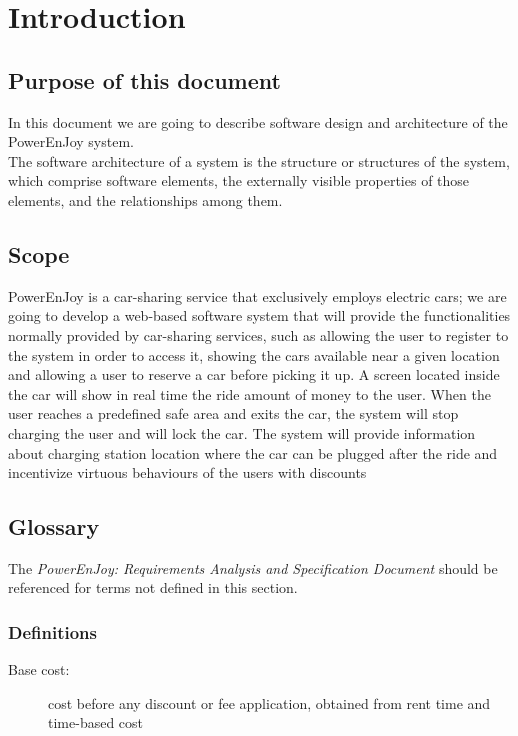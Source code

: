 \section{Introduction}
\subsection{Purpose of this document}
In this document we are going to describe software design and architecture of the PowerEnJoy system.\\
The software architecture of a system is the structure or structures of the system, which comprise software elements, the externally visible properties of those elements, and the relationships among them.\cite{SoftwareArch}

\subsection{Scope}
PowerEnJoy is a car-sharing service that exclusively employs electric cars; we are going to develop a web-based software system that will provide the functionalities normally provided by car-sharing services, such as allowing the user to register to the system in order to access it, showing the cars available near a given location and allowing a user to reserve a car before picking it up.
A screen located inside the car will show in real time the ride amount of money to the user. When the user reaches a predefined safe area and exits the car, the system will stop charging the user and will lock the car. The system will provide information about charging station location where the car can be plugged after the ride and incentivize virtuous behaviours of the users with discounts\cite{RASD}
\subsection{Glossary}
The \emph{PowerEnJoy: Requirements Analysis and Specification Document}\cite{RASD} should be referenced for terms not defined in this section.
\subsubsection{Definitions}
	\begin{description}
		\item [Base cost:] cost before any discount or fee application, obtained from rent time and time-based cost
	\end{description}
